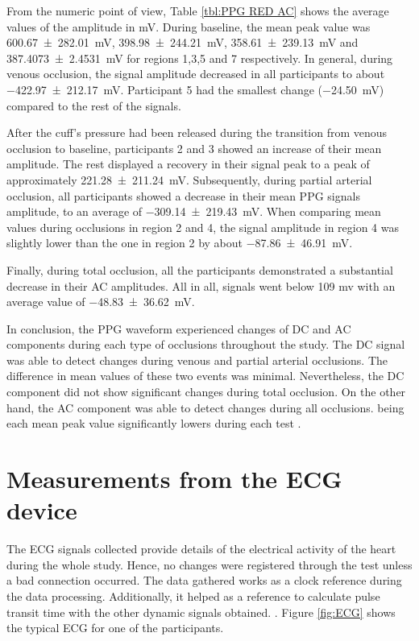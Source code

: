 From the numeric point of view, Table \ref{tbl:PPG RED AC} shows the average values of the amplitude in mV. During baseline, the mean peak value was \SI{600.67(28201)}{\milli\volt}, \SI{398.98(24421)}{\milli\volt}, \SI{358.61(23913)}{\milli\volt} and \SI{387.4073(24531)}{\milli\volt} for regions 1,3,5 and 7 respectively. In general, during venous occlusion, the signal amplitude decreased in all participants to about \SI{-422.97(21217)}{\milli\volt}. Participant 5 had the smallest change (\SI{-24.50}{\milli\volt}) compared to the rest of the signals. 

After the cuff's pressure had been released during the transition from venous occlusion to baseline, participants 2 and 3 showed an increase of their mean amplitude. The rest displayed a recovery in their signal peak to a peak of approximately \SI{221.28(21124)}{\milli\volt}. Subsequently, during partial arterial occlusion, all participants showed a decrease in their mean PPG signals amplitude, to an average of \SI{-309.14(21943)}{\milli\volt}. When comparing mean values during occlusions in region 2 and 4, the signal amplitude in region 4 was slightly lower than the one in region 2 by about \SI{-87.86(4691)}{\milli\volt}. 

Finally, during total occlusion, all the participants demonstrated a substantial decrease in their AC amplitudes. All in all, signals went below 109 mv with an average value of \SI{-48.83(3662)}{\milli\volt}.

In conclusion, the PPG waveform experienced changes of DC and AC components during each type of occlusions throughout the study. The DC signal was able to detect changes during venous and partial arterial occlusions. The difference in mean values of these two events was minimal. Nevertheless, the DC component did not show significant changes during total occlusion.  On the other hand, the AC component was able to detect changes during all occlusions. being each mean peak value significantly lowers during each test . 

\section{Measurements from the ECG device}
\label{section results 9}
The ECG signals collected provide details of the electrical activity of the heart during the whole study. Hence, no changes were registered through the test unless a bad connection occurred. The data gathered works as a clock reference during the data processing. Additionally, it helped as a reference to calculate pulse transit time with the other dynamic signals obtained. . Figure \ref{fig:ECG} shows the typical ECG for one of the participants.

